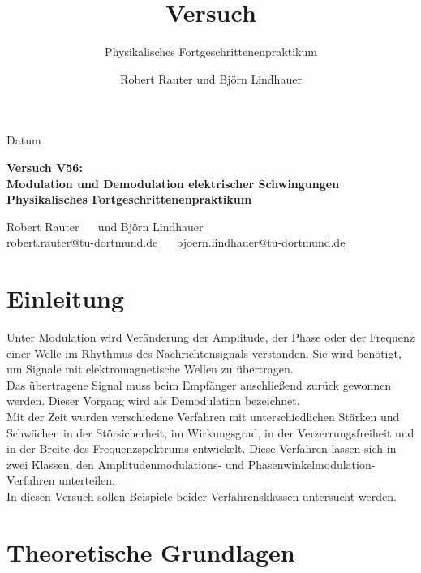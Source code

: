 \documentclass[]{scrartcl}
\title{Versuch \versuchnummer\\ \versuchname}
\subtitle{Physikalisches Fortgeschrittenenpraktikum}
\author{Robert Rauter und Björn Lindhauer}
\date{\versuchdatum}
\newcommand{\versuchnummer}{V56}
\newcommand{\versuchname}{Modulation und Demodulation elektrischer Schwingungen}
\newcommand{\versuchdatum}{Datum}
\begin{document}
\begin{titlepage}
{\large \versuchdatum}
\vspace{7cm}
\begin{center}
\textbf{\huge Versuch \versuchnummer:}\\
\vspace{0.5cm}
\textbf{\huge \versuchname}\\
\vspace{0.2cm}
\textbf{ Physikalisches Fortgeschrittenenpraktikum}\\
\vspace{9cm}

{\Large Robert Rauter \ \ \hspace{1.5cm} und \hspace{1.5cm} Björn Lindhauer}\\
{ \url{robert.rauter@tu-dortmund.de} \ \ \hspace{2cm} \url{bjoern.lindhauer@tu-dortmund.de}}
\end{center}
\end{titlepage}
\section{Einleitung}
Unter Modulation wird Veränderung der Amplitude, der Phase oder der Frequenz einer Welle im Rhythmus des Nachrichtensignals verstanden. Sie wird benötigt, um Signale mit elektromagnetische Wellen zu übertragen.\\
Das übertragene Signal muss beim Empfänger anschließend zurück gewonnen werden. Dieser Vorgang wird als Demodulation bezeichnet.\\ Mit der Zeit wurden verschiedene Verfahren mit unterschiedlichen Stärken und Schwächen in der Störsicherheit, im Wirkungsgrad, in der Verzerrungsfreiheit und in der Breite des Frequenzspektrums entwickelt. Diese Verfahren lassen sich in zwei Klassen, den Amplitudenmodulations- und Phasenwinkelmodulation- Verfahren unterteilen.\\
In diesen Versuch sollen Beispiele beider Verfahrensklassen untersucht werden.
\section{Theoretische Grundlagen}
\end{document}
